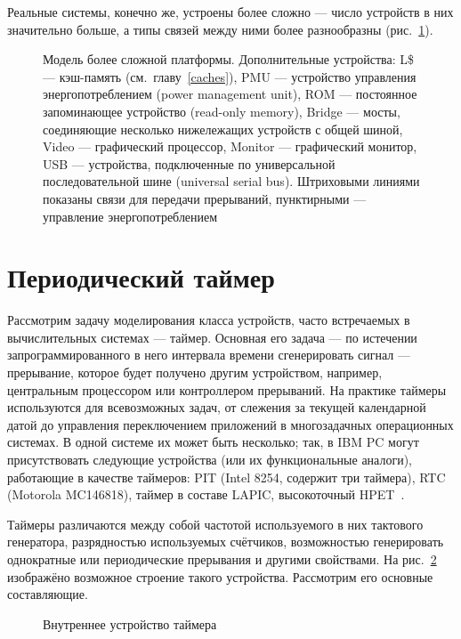 Реальные системы, конечно же, устроены более сложно — число устройств в них значительно больше, а типы связей между ними более разнообразны (рис.~\ref{fig:real-full-platform}).

\begin{figure}[htp]
    \centering
    \caption[Модель более сложной платформы]{Модель более сложной платформы. Дополнительные устройства: L\$ --- кэш-память (см. главу \ref{caches}), PMU --- устройство управления энергопотреблением (\abbr power management unit), ROM --- постоянное запоминающее устройство (\abbr read-only memory), Bridge --- мосты, соединяющие несколько нижележащих устройств с общей шиной, Video --- графический процессор, Monitor --- графический монитор, USB --- устройства, подключенные по универсальной последовательной шине (\abbr universal serial bus). Штриховыми линиями показаны связи для передачи прерываний, пунктирными --- управление энергопотреблением}
    \label{fig:real-full-platform}
\end{figure}

\section{Периодический таймер}

Рассмотрим задачу моделирования класса устройств, часто встречаемых в вычислительных системах --- таймер. Основная его задача --- по истечении запрограммированного в него интервала времени сгенерировать сигнал --- прерывание, которое будет получено другим устройством, например, центральным процессором или контроллером прерываний. На практике таймеры используются для всевозможных задач, от слежения за текущей календарной датой до управления переключением приложений в многозадачных операционных системах. В одной системе их может быть несколько; так, в IBM PC могут присутствовать следующие устройства (или их функциональные аналоги), работающие в качестве таймеров: PIT (Intel 8254, содержит три таймера), RTC (Motorola MC146818), таймер в составе LAPIC, высокоточный HPET~\cite{hpet}.

Таймеры различаются между собой частотой используемого в них тактового генератора, разрядностью используемых счётчиков, возможностью генерировать однократные или периодические прерывания и другими свойствами.
На рис.~\ref{fig:periodic-timer} изображёно возможное строение такого устройства. Рассмотрим его основные составляющие.

\begin{figure}[htp]
    \centering
    \caption[Внутреннее устройство таймера]{Внутреннее устройство таймера}
    \label{fig:periodic-timer}
\end{figure}

